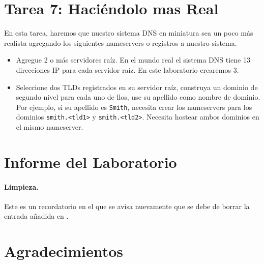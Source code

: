 \section{Tarea 7: Haciéndolo mas Real}

En esta tarea, haremos que nuestro sistema DNS en miniatura sea un poco más realista agregando los siguientes nameservers o registros a nuestro sistema.


\begin{itemize}
\item Agregue 2 o más servidores raíz. En el mundo real el sistema DNS tiene 13 direcciones IP para cada servidor raíz. En este laboratorio crearemos 3.

\item Seleccione dos TLDs registrados en su servidor raíz, construya un dominio de segundo nivel para cada uno de llos, use su apellido como nombre de dominio.
Por ejemplo, si su apellido es \texttt{Smith}, necesita crear los nameservers para los dominios \texttt{smith.<tld1>} y \texttt{smith.<tld2>}.
Necesita hostear ambos dominios en el mismo nameserver.
\end{itemize}





 


\section{Informe del Laboratorio}



\paragraph{Limpieza.} Este es un recordatorio en el que se avisa nuevamente que se debe de borrar la entrada añadida en .

\section*{Agradecimientos}





